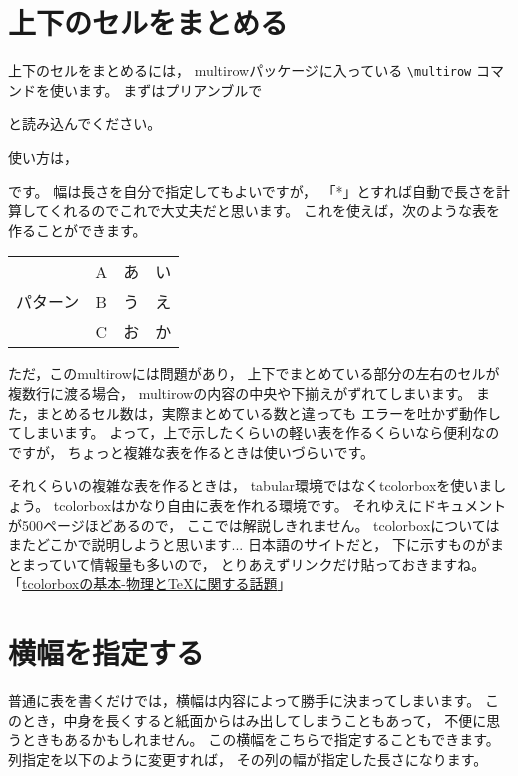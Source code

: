 \section{上下のセルをまとめる}
上下のセルをまとめるには，
multirowパッケージに入っている
\verb|\multirow| コマンドを使います。
まずはプリアンブルで
\begin{ITeX}
\usepackage{multirow}
\end{ITeX}
と読み込んでください。

使い方は，
\begin{ITeX}
\end{ITeX}
です。
幅は長さを自分で指定してもよいですが，
「*」とすれば自動で長さを計算してくれるのでこれで大丈夫だと思います。
これを使えば，次のような表を作ることができます。

\begin{IOTeX*}
\begin{tabular}{|c|c|cc|} \hline
\multirow{3}{*}{パターン} & A & あ & い \\ \cline{2-4}
& B & う & え \\ \cline{2-4}
& C & お & か \\ \hline
\end{tabular}
\end{IOTeX*}

ただ，このmultirowには問題があり，
上下でまとめている部分の左右のセルが複数行に渡る場合，
multirowの内容の中央や下揃えがずれてしまいます。
また，まとめるセル数は，実際まとめている数と違っても
エラーを吐かず動作してしまいます。
よって，上で示したくらいの軽い表を作るくらいなら便利なのですが，
ちょっと複雑な表を作るときは使いづらいです。

それくらいの複雑な表を作るときは，
tabular環境ではなくtcolorboxを使いましょう。
tcolorboxはかなり自由に表を作れる環境です。
それゆえにドキュメントが500ページほどあるので，
ここでは解説しきれません。
tcolorboxについてはまたどこかで説明しようと思います...
日本語のサイトだと，
下に示すものがまとまっていて情報量も多いので，
とりあえずリンクだけ貼っておきますね。\\
「\href{http://texmedicine.hatenadiary.jp/entry/2015/12/17/000339}{tcolorboxの基本-物理とTeXに関する話題}」



\section{横幅を指定する}
普通に表を書くだけでは，横幅は内容によって勝手に決まってしまいます。
このとき，中身を長くすると紙面からはみ出してしまうこともあって，
不便に思うときもあるかもしれません。
この横幅をこちらで指定することもできます。
列指定を以下のように変更すれば，
その列の幅が指定した長さになります。

